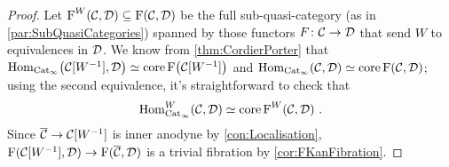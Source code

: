 \begin{proof}
	Let $\operatorname{F}^W(\mathcal{C},\mathcal{D})\subseteq\operatorname{F}(\mathcal{C},\mathcal{D})$ be the full sub-quasi-category (as in \cref{par:SubQuasiCategories}) spanned by those functors $F\colon \mathcal{C}\rightarrow\mathcal{D}$ that send $W$ to equivalences in $\mathcal{D}$. We know from \cref{thm:CordierPorter} that $\Hom_{\cat{Cat}_\infty}\lef(\Cc[W^{-1}],\Dd\righ)\simeq \core\F\lef(\Cc[W^{-1}]\righ)$ and $\Hom_{\cat{Cat}_\infty}\lef(\Cc,\Dd\righ)\simeq \core\F\lef(\Cc,\Dd\righ)$; using the second equivalence, it's straightforward to check that
	\begin{equation*}
		\operatorname{Hom}_{\mathrm{Cat}_\infty}^W\!\left(\mathcal{C},\mathcal{D}\right)\simeq \operatorname{core}\operatorname{F}^W\!\left(\mathcal{C},\mathcal{D}\right)\,.
	\end{equation*}
	Since $\ov\Cc\rightarrow\Cc[W^{-1}]$ is inner anodyne by \cref{con:Localisation}, $\F(\Cc[W^{-1}],\Dd)\rightarrow\F(\ov\Cc,\Dd)$ is a trivial fibration by \cref{cor:FKanFibration}.
	

\end{proof}

